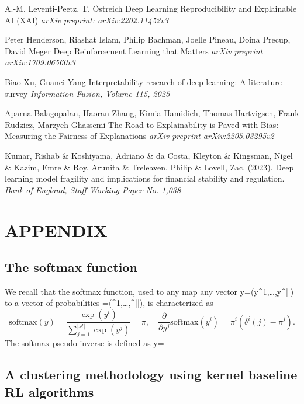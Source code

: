 \documentclass[
]{article}
\def\({}%
\def\){}%
\numberwithin{equation}{section}
\begin{document}
\begin{thebibliography}{1}
{\sc A.-M. Leventi-Peetz, T. Östreich}
Deep Learning Reproducibility and Explainable AI (XAI)
{\it arXiv preprint: arXiv:2202.11452v3}

{\sc Peter Henderson, Riashat Islam, Philip Bachman, Joelle Pineau, Doina Precup, David Meger}
Deep Reinforcement Learning that Matters
{\it arXiv preprint  arXiv:1709.06560v3}

{\sc Biao Xu, Guanci Yang}
Interpretability research of deep learning: A literature survey
{\it Information Fusion, Volume 115, 2025}

{\sc Aparna Balagopalan, Haoran Zhang, Kimia Hamidieh, Thomas Hartvigsen, Frank Rudzicz, Marzyeh Ghassemi}
The Road to Explainability is Paved with Bias: Measuring the Fairness of Explanations
{\it arXiv preprint arXiv:2205.03295v2}

{\sc Kumar, Rishab \& Koshiyama, Adriano \& da Costa, Kleyton \& Kingsman, Nigel \& Kazim, Emre \& Roy, Arunita \& Treleaven, Philip \& Lovell, Zac. (2023).}
Deep learning model fragility and implications for financial stability and regulation. 
{\it Bank of England, Staff Working Paper No. 1,038}

\end{thebibliography}

\appendix
\hypertarget{APPENDIX}{%
\section{APPENDIX}\label{APPENDIX}}

\subsection{The softmax function}

We recall that the softmax function, used to any map any vector
\(y=(y^1,\dots,y^{||})\) to a vector of probabilities
\(\pi=(\pi^1,\dots,\pi^{||})\), is characterized as
\begin{equation} \label{eq:softmax}
 \text{softmax}(y) = \frac{\exp(y^i)}{\sum_{j=1}^{|\mathcal{A}|} \exp(y^j)}=\pi, \quad \frac{\partial}{\partial y^j}\text{softmax}(y^i) = \pi^i(\delta^i(j)-\pi^j).
\end{equation}
The softmax pseudo-inverse is defined as
\(y=\ln \pi\)

\hypertarget{SEK}{%
\subsection{A clustering methodology using kernel baseline RL algorithms}
\label{SEK}
}
\end{document}
